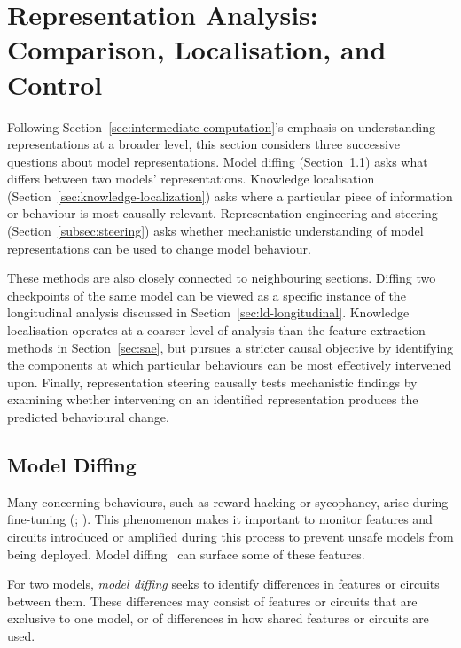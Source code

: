 \section{Representation Analysis: Comparison, Localisation, and Control}
\label{sec:representation}

Following Section~\ref{sec:intermediate-computation}'s emphasis on understanding representations at a broader level, this section considers three successive questions about model representations. Model diffing (Section~\ref{sec:model-diffing}) asks what differs between two models' representations. Knowledge localisation (Section~\ref{sec:knowledge-localization}) asks where a particular piece of information or behaviour is most causally relevant. Representation engineering and steering (Section~\ref{subsec:steering}) asks whether mechanistic understanding of model representations can be used to change model behaviour.

These methods are also closely connected to neighbouring sections. Diffing two checkpoints of the same model can be viewed as a specific instance of the longitudinal analysis discussed in Section~\ref{sec:ld-longitudinal}. Knowledge localisation operates at a coarser level of analysis than the feature-extraction methods in Section~\ref{sec:sae}, but pursues a stricter causal objective by identifying the components at which particular behaviours can be most effectively intervened upon. Finally, representation steering causally tests mechanistic findings by examining whether intervening on an identified representation produces the predicted behavioural change.

\subsection{Model Diffing}
\label{sec:model-diffing}

Many concerning behaviours, such as reward hacking or sycophancy, arise during fine-tuning (; ). This phenomenon makes it important to monitor features and circuits introduced or amplified during this process to prevent unsafe models from being deployed. Model diffing~ can surface some of these features. 

\begin{definitionbox}
For two models, \emph{model diffing} seeks to identify differences in features or circuits between them. These differences may consist of features or circuits that are exclusive to one model, or of differences in how shared features or circuits are used.
\end{definitionbox}

